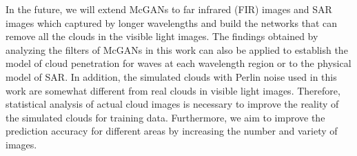 \documentclass[10pt,twocolumn,letterpaper]{article}
\begin{document}
In the future, we will extend McGANs to far infrared (FIR) images and SAR images which captured by longer wavelengths and build the networks that can remove all the clouds in the visible light images. 
The findings obtained by analyzing the filters of McGANs in this work can also be applied to establish the model of cloud penetration for waves at each wavelength region or to the physical model of SAR. 
In addition, the simulated clouds with Perlin noise used in this work are somewhat different from real clouds in visible light images. 
Therefore, statistical analysis of actual cloud images is necessary to improve the reality of the simulated clouds for training data. 
Furthermore, we aim to improve the prediction accuracy for different areas by increasing the number and variety of images.








\end{document}
